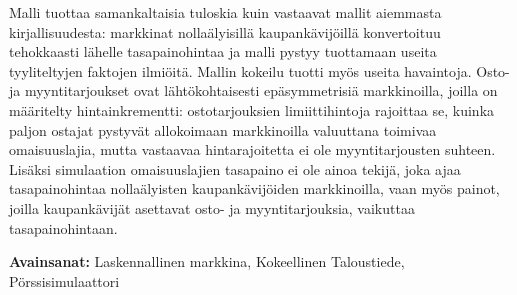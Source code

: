 Malli tuottaa samankaltaisia tuloskia kuin vastaavat mallit aiemmasta kirjallisuudesta: markkinat nollaälyisillä
kaupankävijöillä konvertoituu tehokkaasti lähelle tasapainohintaa ja malli pystyy tuottamaan useita tyyliteltyjen 
faktojen ilmiöitä. Mallin kokeilu tuotti myös useita havaintoja. Osto- ja myyntitarjoukset ovat lähtökohtaisesti 
epäsymmetrisiä markkinoilla, joilla on määritelty hintainkrementti: ostotarjouksien limiittihintoja rajoittaa 
se, kuinka paljon ostajat pystyvät allokoimaan markkinoilla valuuttana toimivaa omaisuuslajia, mutta vastaavaa 
hintarajoitetta ei ole myyntitarjousten suhteen. Lisäksi simulaation omaisuuslajien tasapaino ei ole ainoa tekijä,
joka ajaa tasapainohintaa nollaälyisten kaupankävijöiden markkinoilla, vaan myös painot, joilla kaupankävijät 
asettavat osto- ja myyntitarjouksia, vaikuttaa tasapainohintaan.

\textbf{Avainsanat:} Laskennallinen markkina, Kokeellinen Taloustiede, Pörssisimulaattori